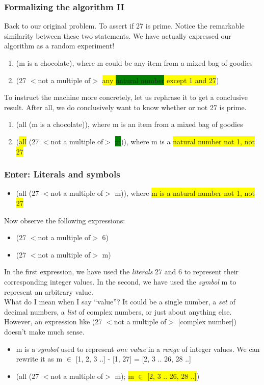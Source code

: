 \frame
{
  \frametitle{Formalizing the algorithm II}
  Back to our original problem. To assert if 27 is prime. Notice the remarkable similarity between these two statements. We have actually expressed our algorithm as a random experiment!
  \begin{enumerate}
    \item (m is a chocolate), where m could be any item from a mixed bag of goodies
    \item (27 $<$not a multiple of$>$ \colorbox{yellow}{any \colorbox{green}{natural number} except 1 and 27})
  \end{enumerate}
  To instruct the machine more concretely, let us rephrase it to get a conclusive result. After all, we do conclusively want to know whether or not 27 is prime.
  \begin{enumerate}
    \item (all (m is a chocolate)), where m is an item from a mixed bag of goodies
    \item (\colorbox{yellow}{all} (27 $<$not a multiple of$>$ \colorbox{green}{m})), where m is a \colorbox{yellow}{natural number not 1, not 27}
  \end{enumerate}
}
\frame
{
  \frametitle{Enter: Literals and symbols}
  \begin{itemize}
    \item[] (all (27 $<$not a multiple of$>$ m)), where \colorbox{yellow}{m is a natural number not 1, not 27}
  \end{itemize}
  Now observe the following expressions:
  \begin{itemize}
    \item (27 $<$not a multiple of$>$ 6)
    \item (27 $<$not a multiple of$>$ m)
  \end{itemize}
  In the first expression, we have used the \textit{literals} 27 and 6 to represent their corresponding integer values. In the second, we have used the \textit{symbol} m to represent an arbitrary value.\\
  What do I mean when I say ``value''? It could be a single number, a \textit{set} of decimal numbers, a \textit{list} of complex numbers, or just about anything else. However, an expression like (27 $<$not a multiple of$>$ [complex number]) doesn't make much sense.
  \begin{itemize}
    \item m is a \textit{symbol} used to represent \textit{one value} in a \textit{range} of integer values. We can rewrite it as m $\in$ [1, 2, 3 ..] - [1, 27] = [2, 3 .. 26, 28 ..]
    \item[] (all (27 $<$not a multiple of$>$ m); \colorbox{yellow}{m $\in$ [2, 3 .. 26, 28 ..]})
  \end{itemize}
}
